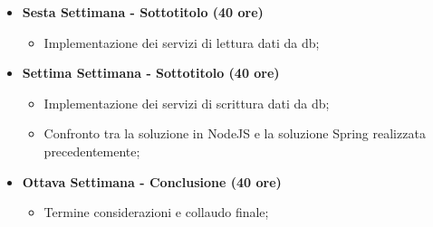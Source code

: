 {\begin{itemize}
        \begin{itemize}
            \item Realizzazione di un servizio REST prototipale con NodeJS;
            \item Analisi e Progettazione dei nuovi servizi per il progetto SmartParking;
        \end{itemize}
        \item \textbf{Sesta Settimana - Sottotitolo (40 ore)} 
        \begin{itemize}
            \item Implementazione dei servizi di lettura dati da db;
        \end{itemize}
        \item \textbf{Settima Settimana - Sottotitolo (40 ore)} 
        \begin{itemize}
            \item Implementazione dei servizi di scrittura dati da db;
            \item Confronto tra la soluzione in NodeJS e la soluzione Spring realizzata precedentemente;
        \end{itemize}
        \item \textbf{Ottava Settimana - Conclusione (40 ore)} 
        \begin{itemize}
            \item Termine considerazioni e collaudo finale;
        \end{itemize}
    \end{itemize}
}

\newcommand{\totaleOre}{320}

\newcommand{\obiettiviObbligatori}{
	 \item \underline{\textit{O01}}: Acquisizione competenze sulle tematiche sopra descritte;
	 \item \underline{\textit{O02}}: Capacità di raggiungere gli obiettivi richiesti in autonomia seguendo il cronoprogramma;
	 \item \underline{\textit{O03}}: Portare a termine l’implementazione dei microservizi richiesti con una percentuale di
     superamento pari al 80\%;
	 
}

\newcommand{\obiettiviDesiderabili}{
	 \item \underline{\textit{D01}}: Portare a termine l’implementazione dei microservizi richiesti con una percentuale di
     superamento pari al 100\%;
}

\newcommand{\obiettiviFacoltativi}{
	 \item \underline{\textit{F01}}: Studiare come poter implementare le bestPractice dell’architettura a microservizi con NodeJS;
}